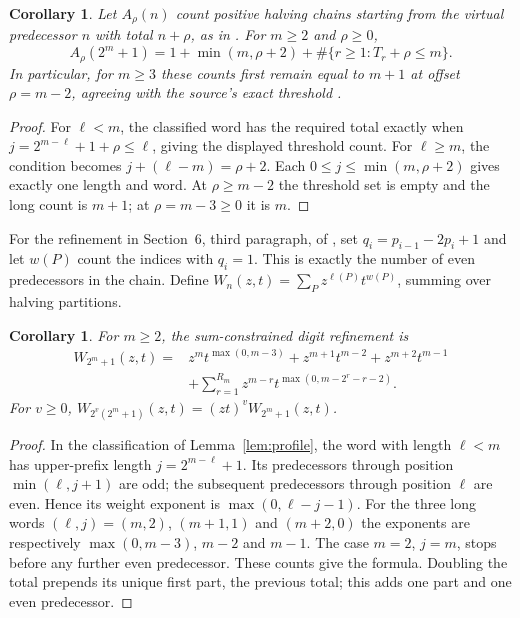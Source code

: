 \documentclass[11pt]{article}
\newtheorem{corollary}[theorem]{Corollary}
\begin{document}
\begin{corollary}\label{cor:offset}
Let $A_\rho(n)$ count positive halving chains starting from the virtual
predecessor $n$ with total $n+\rho$, as in \cite[Section~4]{alekseyev}.
For $m\ge2$ and $\rho\ge0$,
\[
 A_\rho(2^m+1)=1+\min(m,\rho+2)
                  +\#\{r\ge1:T_r+\rho\le m\}.
\]
In particular, for $m\ge3$ these counts first remain equal to $m+1$
at offset $\rho=m-2$, agreeing with the source's exact threshold
\cite[Theorem~17, Corollary~18]{alekseyev}.
\end{corollary}
\begin{proof}
For $\ell<m$, the classified word has the required total exactly when
$j=2^{m-\ell}+1+\rho\le\ell$, giving the displayed threshold count.
For $\ell\ge m$, the condition becomes $j+(\ell-m)=\rho+2$.
Each $0\le j\le\min(m,\rho+2)$ gives exactly one length and word.
At $\rho\ge m-2$ the threshold set is empty and the long count is
$m+1$; at $\rho=m-3\ge0$ it is $m$.
\end{proof}

For the refinement in Section~6, third paragraph, of \cite{alekseyev},
set $q_i=p_{i-1}-2p_i+1$ and let $w(P)$ count the indices with $q_i=1$.
This is exactly the number of even predecessors in the chain. Define
$W_n(z,t)=\sum_P z^{\ell(P)}t^{w(P)}$, summing over halving partitions.
\begin{corollary}\label{cor:weighted}
For $m\ge2$, the sum-constrained digit refinement is
\begin{align*}
 W_{2^m+1}(z,t)={}&z^m t^{\max(0,m-3)}
       +z^{m+1}t^{m-2}+z^{m+2}t^{m-1}\\
       &+\sum_{r=1}^{R_m}z^{m-r}t^{\max(0,m-2^r-r-2)}.
\end{align*}
For $v\ge0$, $W_{2^v(2^m+1)}(z,t)=(zt)^vW_{2^m+1}(z,t)$.
\end{corollary}
\begin{proof}
In the classification of Lemma~\ref{lem:profile}, the word with length
$\ell<m$ has upper-prefix length $j=2^{m-\ell}+1$.
Its predecessors through position $\min(\ell,j+1)$ are odd; the subsequent
predecessors through position $\ell$ are even. Hence its weight exponent
is $\max(0,\ell-j-1)$. For the three long words $(\ell,j)=(m,2)$,
$(m+1,1)$ and $(m+2,0)$ the exponents are respectively
$\max(0,m-3)$, $m-2$ and $m-1$. The case $m=2$, $j=m$, stops
before any further even predecessor. These counts give the formula.
Doubling the total prepends its unique first part, the previous total;
this adds one part and one even predecessor.
\end{proof}
\end{document}
